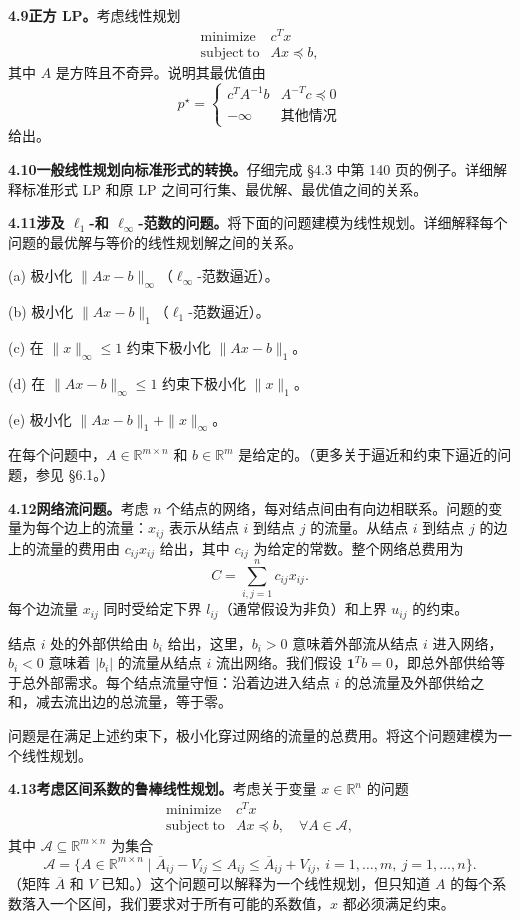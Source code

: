 \documentclass[UTF8, 12pt, fontset=fandol, oneside]{ctexart}
\begin{document}
\noindent\textbf{4.9\quad 正方 LP。}\quad 考虑线性规划
\[
\begin{array}{ll}
\mathop{\mathrm{minimize}} & c^Tx\\
\mathrm{subject\ to} & Ax\preceq b,
\end{array}
\]
其中 $A$ 是方阵且不奇异。说明其最优值由
\[
p^\star=
\begin{cases}
c^TA^{-1}b & A^{-T}c\preceq0\\
-\infty & \text{其他情况}
\end{cases}
\]
给出。

\noindent\textbf{4.10\quad 一般线性规划向标准形式的转换。}\quad 仔细完成 \S4.3 中第 140 页的例子。详细解释标准形式 LP 和原 LP 之间可行集、最优解、最优值之间的关系。

\noindent\textbf{4.11\quad 涉及 $\ell_1$-和 $\ell_\infty$-范数的问题。}\quad 将下面的问题建模为线性规划。详细解释每个问题的最优解与等价的线性规划解之间的关系。

(a) 极小化 $\|Ax-b\|_\infty$（$\ell_\infty$-范数逼近）。

(b) 极小化 $\|Ax-b\|_1$（$\ell_1$-范数逼近）。

(c) 在 $\|x\|_\infty\leq1$ 约束下极小化 $\|Ax-b\|_1$。

(d) 在 $\|Ax-b\|_\infty\leq1$ 约束下极小化 $\|x\|_1$。

(e) 极小化 $\|Ax-b\|_1+\|x\|_\infty$。

在每个问题中，$A\in\mathbb{R}^{m\times n}$ 和 $b\in\mathbb{R}^m$ 是给定的。（更多关于逼近和约束下逼近的问题，参见 \S6.1。）

\noindent\textbf{4.12\quad 网络流问题。}\quad 考虑 $n$ 个结点的网络，每对结点间由有向边相联系。问题的变量为每个边上的流量：$x_{ij}$ 表示从结点 $i$ 到结点 $j$ 的流量。从结点 $i$ 到结点 $j$ 的边上的流量的费用由 $c_{ij}x_{ij}$ 给出，其中 $c_{ij}$ 为给定的常数。整个网络总费用为
\[
C=\sum_{i,j=1}^n c_{ij}x_{ij}.
\]
每个边流量 $x_{ij}$ 同时受给定下界 $l_{ij}$（通常假设为非负）和上界 $u_{ij}$ 的约束。

结点 $i$ 处的外部供给由 $b_i$ 给出，这里，$b_i>0$ 意味着外部流从结点 $i$ 进入网络，$b_i<0$ 意味着 $|b_i|$ 的流量从结点 $i$ 流出网络。我们假设 $\mathbf{1}^Tb=0$，即总外部供给等于总外部需求。每个结点流量守恒：沿着边进入结点 $i$ 的总流量及外部供给之和，减去流出边的总流量，等于零。

问题是在满足上述约束下，极小化穿过网络的流量的总费用。将这个问题建模为一个线性规划。

\noindent\textbf{4.13\quad 考虑区间系数的鲁棒线性规划。}\quad 考虑关于变量 $x\in\mathbb{R}^n$ 的问题
\[
\begin{array}{ll}
\mathop{\mathrm{minimize}} & c^Tx\\
\mathrm{subject\ to} & Ax\preceq b,\quad \forall A\in\mathcal{A},
\end{array}
\]
其中 $\mathcal{A}\subseteq\mathbb{R}^{m\times n}$ 为集合
\[
\mathcal{A}=\{A\in\mathbb{R}^{m\times n}\mid \overline{A}_{ij}-V_{ij}\leq A_{ij}\leq\overline{A}_{ij}+V_{ij},\ i=1,\ldots,m,\ j=1,\ldots,n\}.
\]
（矩阵 $\overline{A}$ 和 $V$ 已知。）这个问题可以解释为一个线性规划，但只知道 $A$ 的每个系数落入一个区间，我们要求对于所有可能的系数值，$x$ 都必须满足约束。
\end{document}
